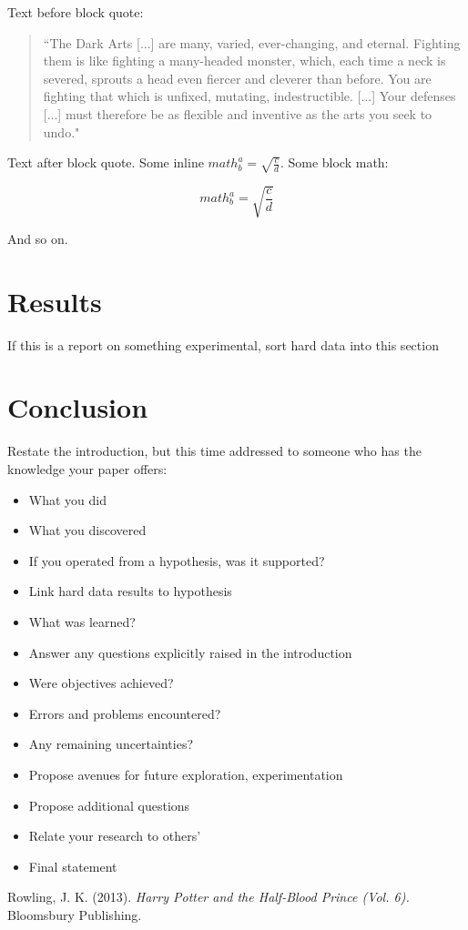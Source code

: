 \documentclass[12pt,a4paper]{article}
\begin{document}
	Text before block quote:
	
	\blockcquote{HarryPotter}{“The Dark Arts [...] are many, varied, ever-changing, and eternal. Fighting them is like fighting a many-headed monster, which, each time a neck is severed, sprouts a head even fiercer and cleverer than before. You are fighting that which is unfixed, mutating, indestructible. [...] Your defenses [...] must therefore be as flexible and inventive as the arts you seek to undo."}
	
	Text after block quote. Some inline $ math^{a}_{b}=\sqrt{\frac{c}{d}} $. Some block math:
	
	$$ math^{a}_{b}=\sqrt{\frac{c}{d}} $$

	And so on.
	
	\section{Results}
	If this is a report on something experimental, sort hard data into this section

	\section{Conclusion}
	Restate the introduction, but this time addressed to someone who has the knowledge your paper offers:
	\begin{itemize}
		\item What you did
		\item What you discovered
		\item If you operated from a hypothesis, was it supported?
		\item Link hard data results to hypothesis
		\item What was learned?
		\item Answer any questions explicitly raised in the introduction
		\item Were objectives achieved?
		\item Errors and problems encountered?
		\item Any remaining uncertainties?
		\item Propose avenues for future exploration, experimentation
		\item Propose additional questions
		\item Relate your research to others'
		\item Final statement
	\end{itemize}
	
	\begin{thebibliography}{9}
		
		Rowling, J. K. (2013). 
		\textit{Harry Potter and the Half-Blood Prince (Vol. 6). }
		Bloomsbury Publishing.
		
	\end{thebibliography}
	
\end{document}
